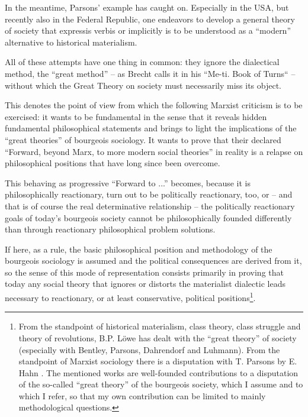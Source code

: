 \documentclass[11pt,a4paper]{article}
\begin{document}
In the meantime, Parsons' example has caught on. Especially in the USA, but
recently also in the Federal Republic, one endeavors to develop a general
theory of society that expressis verbis or implicitly is to be understood as a
“modern” alternative to historical materialism.

All of these attempts have one thing in common: they ignore the dialectical
method, the “great method” -- as Brecht calls it in his “Me-ti. Book of Turns“
-- without which the Great Theory on society must necessarily miss its object.

This denotes the point of view from which the following Marxist criticism is
to be exercised: it wants to be fundamental in the sense that it reveals
hidden fundamental philosophical statements and brings to light the
implications of the “great theories” of bourgeois sociology. It wants to prove
that their declared \enquote{Forward, beyond Marx, to more modern social
  theories} in reality is a relapse on philosophical positions that have long
since been overcome.

This behaving as progressive \enquote{Forward to ...} becomes, because it is
philosophically reactionary, turn out to be politically reactionary, too, or
-- and that is of course the real determinative relationship -- the
politically reactionary goals of today's bourgeois society cannot be
philosophically founded differently than through reactionary philosophical
problem solutions.

If here, as a rule, the basic philosophical position and methodology of the
bourgeois sociology is assumed and the political consequences are derived from
it, so the sense of this mode of representation consists primarily in proving
that today any social theory that ignores or distorts the materialist
dialectic leads necessary to reactionary, or at least conservative, political
positions\footnote{From the standpoint of historical materialism, class
  theory, class struggle and theory of revolutions, B.P. Löwe \cite{Loewe1971}
  has dealt with the \enquote{great theory} of society (especially with
  Bentley, Parsons, Dahrendorf and Luhmann).  From the standpoint of Marxist
  sociology there is a disputation with T. Parsons by E. Hahn \cite{Hahn1965}.
  The mentioned works are well-founded contributions to a disputation of the
  so-called \enquote{great theory} of the bourgeois society, which I assume
  and to which I refer, so that my own contribution can be limited to mainly
  methodological questions.}.


\end{document}
